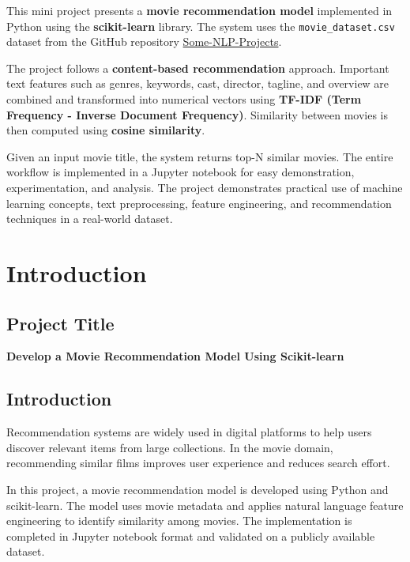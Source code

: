 \documentclass[12pt,a4paper]{report}
\begin{document}
This mini project presents a \textbf{movie recommendation model} implemented in
Python using the \textbf{scikit-learn} library. The system uses the
\texttt{movie\_dataset.csv} dataset from the GitHub repository
\href{https://github.com/rashida048/Some-NLP-Projects}{Some-NLP-Projects}.

The project follows a \textbf{content-based recommendation} approach. Important text
features such as genres, keywords, cast, director, tagline, and overview are
combined and transformed into numerical vectors using
\textbf{TF-IDF (Term Frequency - Inverse Document Frequency)}. Similarity between
movies is then computed using \textbf{cosine similarity}.

Given an input movie title, the system returns top-N similar movies. The entire
workflow is implemented in a Jupyter notebook for easy demonstration,
experimentation, and analysis. The project demonstrates practical use of machine
learning concepts, text preprocessing, feature engineering, and recommendation
techniques in a real-world dataset.

\tableofcontents
\clearpage


\chapter{Introduction}

\section{Project Title}
\textbf{Develop a Movie Recommendation Model Using Scikit-learn}

\section{Introduction}
Recommendation systems are widely used in digital platforms to help users discover
relevant items from large collections. In the movie domain, recommending similar
films improves user experience and reduces search effort.

In this project, a movie recommendation model is developed using Python and
scikit-learn. The model uses movie metadata and applies natural language feature
engineering to identify similarity among movies. The implementation is completed in
Jupyter notebook format and validated on a publicly available dataset.
\end{document}
